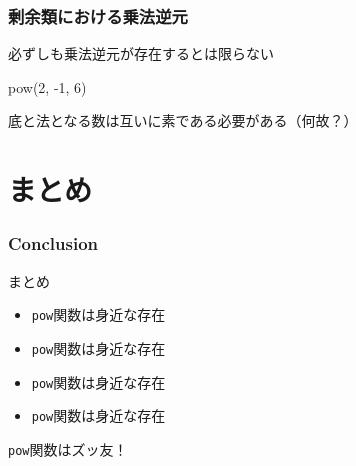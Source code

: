 \documentclass[aspectratio=169,dvipdfmx,14pt,notheorems]{beamer}
\theoremstyle{definition}
\begin{document}
\begin{frame}[fragile]\frametitle{剰余類における乗法逆元}

\begin{alertblock}{必ずしも乗法逆元が存在するとは限らない}

\begin{pyconsole}
pow(2, -1, 6)
\end{pyconsole}
\end{alertblock}
底と法となる数は互いに素である必要がある（何故？）
\end{frame}

\section{まとめ}

\begin{frame}[fragile]\frametitle{Conclusion}
\begin{block}{まとめ}
\begin{itemize}
\item \texttt{pow}関数は身近な存在
\item \texttt{pow}関数は身近な存在
\item \texttt{pow}関数は身近な存在
\item \texttt{pow}関数は身近な存在
\end{itemize}
\end{block}
\texttt{pow}関数はズッ友！
\end{frame}
\end{document}
